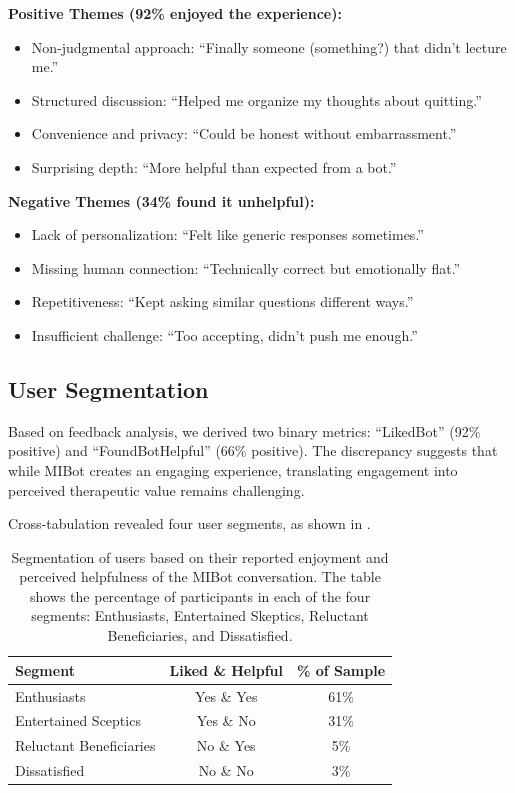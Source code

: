 \textbf{Positive Themes (92\% enjoyed the experience):}
\begin{itemize}
	\item Non-judgmental approach: ``Finally someone (something?) that didn't lecture me.''
	\item Structured discussion: ``Helped me organize my thoughts about quitting.''
	\item Convenience and privacy: ``Could be honest without embarrassment.''
	\item Surprising depth: ``More helpful than expected from a bot.''
\end{itemize}

\textbf{Negative Themes (34\% found it unhelpful):}
\begin{itemize}
	\item Lack of personalization: ``Felt like generic responses sometimes.''
	\item Missing human connection: ``Technically correct but emotionally flat.''
	\item Repetitiveness: ``Kept asking similar questions different ways.''
	\item Insufficient challenge: ``Too accepting, didn't push me enough.''
\end{itemize}

\subsection*{User Segmentation}

Based on feedback analysis, we derived two binary metrics: ``LikedBot'' (92\% positive) and ``FoundBotHelpful'' (66\% positive). The discrepancy suggests that while MIBot creates an engaging experience, translating engagement into perceived therapeutic value remains challenging.

Cross-tabulation revealed four user segments, as shown in .

\begin{table}[ht]
	\centering
	\small
	\setlength{\tabcolsep}{4pt}
	\renewcommand{\arraystretch}{1.1}
	\begin{tabular}{@{}lcc@{}}
		\toprule
		\textbf{Segment}        & \textbf{Liked \& Helpful} & \textbf{\% of Sample} \\
		\midrule
		Enthusiasts             & Yes \& Yes                & 61\%                  \\
		Entertained Sceptics    & Yes \& No                 & 31\%                  \\
		Reluctant Beneficiaries & No \& Yes                 & 5\%                   \\
		Dissatisfied            & No \& No                  & 3\%                   \\
		\bottomrule
	\end{tabular}
	\caption[Segmentation of MIBot Participants based on their Experiences]{Segmentation of users based on their reported enjoyment and perceived helpfulness of the MIBot conversation. The table shows the percentage of participants in each of the four segments: Enthusiasts, Entertained Skeptics, Reluctant Beneficiaries, and Dissatisfied.}
	\label{table:user_segments}
\end{table}

